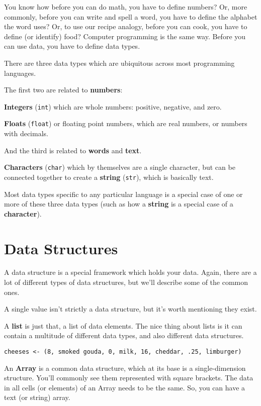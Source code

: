 \documentclass[
]{book}
\begin{document}
You know how before you can do math, you have to define numbers? Or, more commonly, before you can write and spell a word, you have to define the alphabet the word uses? Or, to use our recipe analogy, before you can cook, you have to define (or identify) food? Computer programming is the same way. Before you can use data, you have to define data types.

There are three data types which are ubiquitous across most programming languages.

The first two are related to \textbf{numbers}:

\textbf{Integers} (\texttt{int}) which are whole numbers: positive, negative, and zero.

\textbf{Floats} (\texttt{float}) or floating point numbers, which are real numbers, or numbers with decimals.

And the third is related to \textbf{words} and \textbf{text}.

\textbf{Characters} (\texttt{char}) which by themselves are a single character, but can be connected together to create a \textbf{string} (\texttt{str}), which is basically text.

Most data types specific to any particular language is a special case of one or more of these three data types (such as how a \textbf{string} is a special case of a \textbf{character}).

\section{Data Structures}\label{data-structures}

A data structure is a special framework which holds your data. Again, there are a lot of different types of data structures, but we'll describe some of the common ones.

A single value isn't strictly a data structure, but it's worth mentioning they exist.

A \textbf{list} is just that, a list of data elements. The nice thing about lists is it can contain a multitude of different data types, and also different data structures.

\texttt{cheeses\ \textless{}-\ (8,\ smoked\ gouda,\ 0,\ milk,\ 16,\ cheddar,\ .25,\ limburger)}

An \textbf{Array} is a common data structure, which at its base is a single-dimension structure. You'll commonly see them represented with square brackets. The data in all cells (or elements) of an Array needs to be the same. So, you can have a text (or string) array.
\end{document}
